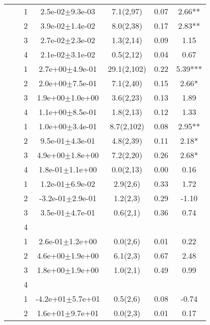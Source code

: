 \begin{longtable}{llccccS[table-format=-2.2, table-space-text-post = {***}]}
   \midrule
{} & {} & 1 &  2.5e-02$\pm$9.3e-03 & 7.1(2,97) & 0.07 & 2.66** \\ 
   &  & 2 &  3.9e-02$\pm$1.4e-02 & 8.0(2,38) & 0.17 & 2.83** \\ 
   &  & 3 &  2.7e-02$\pm$2.3e-02 & 1.3(2,14) & 0.09 & 1.15 \\ 
   &  & 4 &  2.1e-02$\pm$3.1e-02 & 0.5(2,12) & 0.04 & 0.67 \\ 
   \midrule
{} & {} & 1 &  2.7e+00$\pm$4.9e-01 & 29.1(2,102) & 0.22 & 5.39*** \\ 
   &  & 2 &  2.0e+00$\pm$7.5e-01 & 7.1(2,40) & 0.15 & 2.66* \\ 
   &  & 3 &  1.9e+00$\pm$1.0e+00 & 3.6(2,23) & 0.13 & 1.89 \\ 
   &  & 4 &  1.1e+00$\pm$8.5e-01 & 1.8(2,13) & 0.12 & 1.33 \\ 
   \midrule
{} & {} & 1 &  1.0e+00$\pm$3.4e-01 & 8.7(2,102) & 0.08 & 2.95** \\ 
   &  & 2 &  9.5e-01$\pm$4.3e-01 & 4.8(2,39) & 0.11 & 2.18* \\ 
   &  & 3 &  4.9e+00$\pm$1.8e+00 & 7.2(2,20) & 0.26 & 2.68* \\ 
   &  & 4 &  1.8e-01$\pm$1.1e+00 & 0.0(2,13) & 0.00 & 0.16 \\ 
   \midrule
{} & {} & 1 &  1.2e-01$\pm$6.9e-02 & 2.9(2,6) & 0.33 & 1.72 \\ 
   &  & 2 & -3.2e-01$\pm$2.9e-01 & 1.2(2,3) & 0.29 & -1.10 \\ 
   &  & 3 &  3.5e-01$\pm$4.7e-01 & 0.6(2,1) & 0.36 & 0.74 \\ 
   &  & 4 &  &  &  &  \\ 
   \midrule
{} & {} & 1 &  2.6e-01$\pm$1.2e+00 & 0.0(2,6) & 0.01 & 0.22 \\ 
   &  & 2 &  4.6e+00$\pm$1.9e+00 & 6.1(2,3) & 0.67 & 2.48 \\ 
   &  & 3 &  1.8e+00$\pm$1.9e+00 & 1.0(2,1) & 0.49 & 0.99 \\ 
   &  & 4 &  &  &  &  \\ 
   \midrule
{} & {} & 1 & -4.2e+01$\pm$5.7e+01 & 0.5(2,6) & 0.08 & -0.74 \\ 
   &  & 2 &  1.6e+01$\pm$9.7e+01 & 0.0(2,3) & 0.01 & 0.17 \\ 

\end{longtable}
